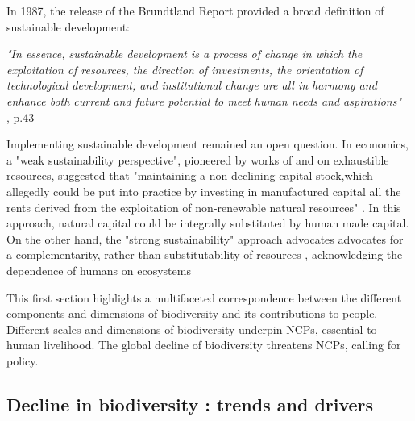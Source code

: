 \begin{tcolorbox}[breakable, 
colback=verylightgray, 
colframe=gray!75!black, 
title= {Box 1 - Weak v. Strong Sustainability},
fontupper=\small]
\par %
\justifying %

In 1987, the release of the Brundtland Report \citep{brundtland} provided a broad definition of sustainable development: 

\begin{displayquote}
\textit{"In essence, sustainable development is a process of change in which the exploitation of
resources, the direction of investments, the orientation of technological development; and institutional change are all in harmony and enhance both current and future potential to meet human needs and aspirations"}\\
\small{\cite{brundtland}, p.43}
\end{displayquote}

Implementing sustainable development remained an open question. In economics, a "weak sustainability perspective", pioneered by works of \cite{hartwick_intergenerational_1977} and \cite{solow_intergenerational_1986} on exhaustible resources, suggested that "maintaining a non-declining capital stock,which allegedly could be put into practice by investing in manufactured capital all the rents derived from the exploitation of non-renewable natural resources" \citep{gomez_history_2010}. In this approach, natural capital could be integrally substituted by human made capital. On the other hand, the "strong sustainability" approach advocates advocates for a complementarity, rather than substitutability of resources \citep{costanza_daly}, acknowledging the dependence of humans on ecosystems
\end{tcolorbox}

This first section highlights a multifaceted correspondence between the different components and dimensions of biodiversity and its contributions to people. Different scales and dimensions of biodiversity underpin NCPs, essential to human livelihood. The global decline of biodiversity threatens NCPs, calling for policy.

\subsection*{Decline in biodiversity : trends and drivers}


